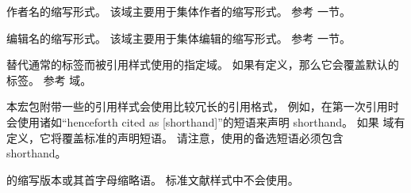 \begin{fieldlist}

作者名的缩写形式。
该域主要用于集体作者的缩写形式。
参考  一节。




编辑名的缩写形式。
该域主要用于集体编辑的缩写形式。
参考  一节。




替代通常的标签而被引用样式使用的指定域。
如果有定义，那么它会覆盖默认的标签。
参考  域。




本宏包附带一些的引用样式会使用比较冗长的引用格式，
例如，在第一次引用时会使用诸如“henceforth cited as [shorthand]”的短语来声明 shorthand。
如果  域有定义，它将覆盖标准的声明短语。
请注意，使用的备选短语必须包含 shorthand。




 的缩写版本或其首字母缩略语。
标准文献样式中不会使用。




\end{fieldlist}

